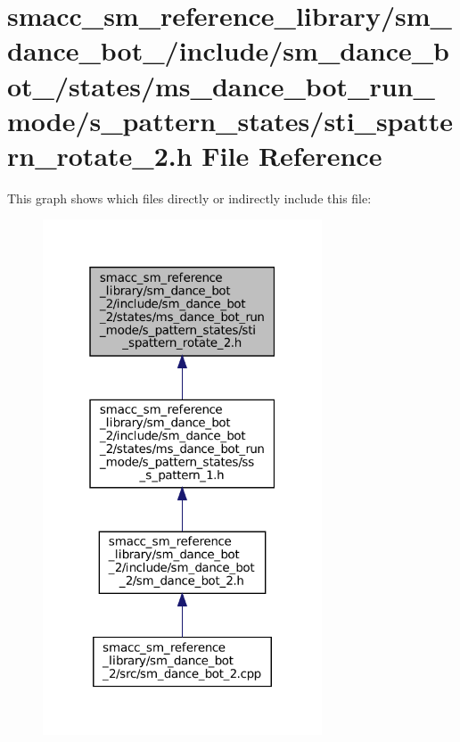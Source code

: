 \hypertarget{sm__dance__bot__2_2include_2sm__dance__bot__2_2states_2ms__dance__bot__run__mode_2s__pattern__st9d4811037bfee63d8b323983a1bb26f7}{}\section{smacc\+\_\+sm\+\_\+reference\+\_\+library/sm\+\_\+dance\+\_\+bot\+\_/include/sm\+\_\+dance\+\_\+bot\+\_/states/ms\+\_\+dance\+\_\+bot\+\_\+run\+\_\+mode/s\+\_\+pattern\+\_\+states/sti\+\_\+spattern\+\_\+rotate\+\_\+2.h File Reference}
\label{sm__dance__bot__2_2include_2sm__dance__bot__2_2states_2ms__dance__bot__run__mode_2s__pattern__st9d4811037bfee63d8b323983a1bb26f7}
This graph shows which files directly or indirectly include this file\+:
\nopagebreak
\begin{figure}[H]
\begin{center}
\leavevmode
\includegraphics[width=235pt]{sm__dance__bot__2_2include_2sm__dance__bot__2_2states_2ms__dance__bot__run__mode_2s__pattern__st2b14104691fcbeb5d5b3d5f616f198a7}
\end{center}
\end{figure}
